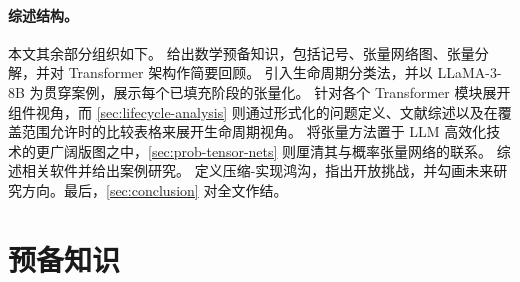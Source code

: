\documentclass[11pt]{article}
\begin{document}
\paragraph{综述结构。}

本文其余部分组织如下。 给出数学预备知识，包括记号、张量网络图、张量分解，并对 Transformer 架构作简要回顾。 引入生命周期分类法，并以 LLaMA-3-8B 为贯穿案例，展示每个已填充阶段的张量化。 针对各个 Transformer 模块展开组件视角，而 \cref{sec:lifecycle-analysis} 则通过形式化的问题定义、文献综述以及在覆盖范围允许时的比较表格来展开生命周期视角。 将张量方法置于 LLM 高效化技术的更广阔版图之中，\cref{sec:prob-tensor-nets} 则厘清其与概率张量网络的联系。 综述相关软件并给出案例研究。 定义压缩-实现鸿沟，指出开放挑战，并勾画未来研究方向。最后，\cref{sec:conclusion} 对全文作结。


\section{预备知识}
\label{sec:preliminaries}
\end{document}
